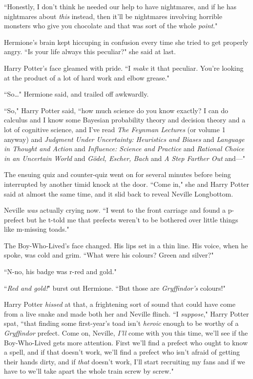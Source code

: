 ``Honestly, I don't think he needed our help to have nightmares, and if he has nightmares about \emph{this} instead, then it'll be nightmares involving horrible monsters who give you chocolate and that was sort of the whole \emph{point}."

Hermione's brain kept hiccuping in confusion every time she tried to get properly angry. ``Is your life always this peculiar?" she said at last.

Harry Potter's face gleamed with pride. ``I \emph{make} it that peculiar. You're looking at the product of a lot of hard work and elbow grease."

``So…" Hermione said, and trailed off awkwardly.

``So," Harry Potter said, ``how much science do you know exactly? I can do calculus and I know some Bayesian probability theory and decision theory and a lot of cognitive science, and I've read \emph{The Feynman Lectures} (or volume 1 anyway) and \emph{Judgment Under Uncertainty: Heuristics and Biases} and \emph{Language in Thought and Action} and \emph{Influence: Science and Practice} and \emph{Rational Choice in an Uncertain World} and \emph{Gödel, Escher, Bach} and \emph{A Step Farther Out} and—"

The ensuing quiz and counter-quiz went on for several minutes before being interrupted by another timid knock at the door. ``Come in," she and Harry Potter said at almost the same time, and it slid back to reveal Neville Longbottom.

Neville \emph{was} actually crying now. ``I went to the front carriage and found a p-prefect but he t-told me that prefects weren't to be bothered over little things like m-missing toads."

The Boy-Who-Lived's face changed. His lips set in a thin line. His voice, when he spoke, was cold and grim. ``What were his colours? Green and silver?"

``N-no, his badge was r-red and gold."

``\emph{Red and gold!}" burst out Hermione. ``But those are \emph{Gryffindor's} colours!"

Harry Potter \emph{hissed} at that, a frightening sort of sound that could have come from a live snake and made both her and Neville flinch. ``I \emph{suppose}," Harry Potter spat, ``that finding some first-year's toad isn't \emph{heroic} enough to be worthy of a \emph{Gryffindor} prefect. Come on, Neville, \emph{I'll} come with you this time, we'll see if the Boy-Who-Lived gets more attention. First we'll find a prefect who ought to know a spell, and if that doesn't work, we'll find a prefect who isn't afraid of getting their hands dirty, and if \emph{that} doesn't work, I'll start recruiting my fans and if we have to we'll take apart the whole train screw by screw."

